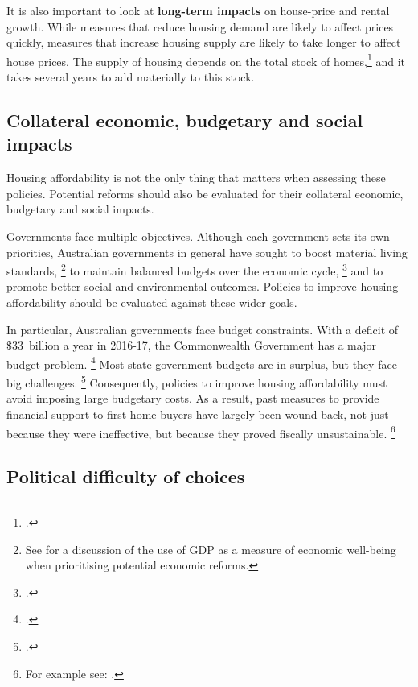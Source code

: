 It is also important to look at \textbf{long-term impacts} on house-price and rental growth.
While measures that reduce housing demand are likely to affect prices quickly, measures that increase housing supply are likely to take longer to affect house prices.
The supply of housing depends on the total stock of homes,\footcite[][8]{RBA2015SubmissionHomeOwnershipInquiry} and it takes several years to add materially to this stock.

\subsection{Collateral economic, budgetary and social impacts }\label{subsec:collateral-economic-budgetary-and-social-impacts}

Housing affordability is not the only thing that matters when assessing these policies.
Potential reforms should also be evaluated for their collateral economic, budgetary and social impacts.

Governments face multiple objectives. Although each government sets its own priorities, Australian governments in general have sought to boost material living standards,%
	\footnote{See \textcite[][8]{DaleyMcGannonGinnivan2012-Supportinganalysis} for a discussion of the use of GDP as a measure of economic well-being when prioritising potential economic reforms.}
to maintain balanced budgets over the economic cycle,%
	\footcite[][11--12]{DaleyEtAl-2013-BalancingBudgets}
and to promote better social and environmental outcomes.
Policies to improve housing affordability should be evaluated against these wider goals.

In particular, Australian governments face budget constraints.
With a deficit of \$33~billion a year in 2016-17, the Commonwealth Government has a major budget problem.%
	\footcite[][1]{Treasury-FBO-201617}
Most state government budgets are in surplus, but they face big challenges.%
	\footcite[][15]{DaleyWood2015FiscalChallenges}
Consequently, policies to improve housing affordability must avoid imposing large budgetary costs.
As a result, past measures to provide financial support to first home buyers have largely been wound back, not just because they were ineffective, but because they proved fiscally unsustainable.%
	\footnote{For example see: \textcites{SMH-2015-wrongtimecutfirsthomegrants}{WAtoday-2017-15kfirsthomegrantcut}.}

\subsection{Political difficulty of choices}\label{subsec:political-difficulty-of-choices}

